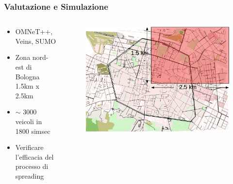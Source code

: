 \documentclass{beamer}
\begin{document}
\begin{frame}
  \frametitle{Valutazione e Simulazione}
  \begin{columns}
    \begin{column}{0.60\textwidth}
      \begin{itemize}
	\item OMNeT++, Veins, SUMO
	\item Zona nord-est di Bologna 1.5km x 2.5km
	\item $\scriptstyle\mathtt{\sim}$ 3000 veicoli in 1800 simsec
	\item Verificare l’efficacia del processo di spreading
      \end{itemize}
    \end{column}

    \begin{column}{0.40\textwidth}
      \begin{figure}
      \includegraphics[width=\columnwidth]{img/sumo-bolo2.png}
      \end{figure}
    \end{column}
  \end{columns}
\end{frame}
\end{document}
